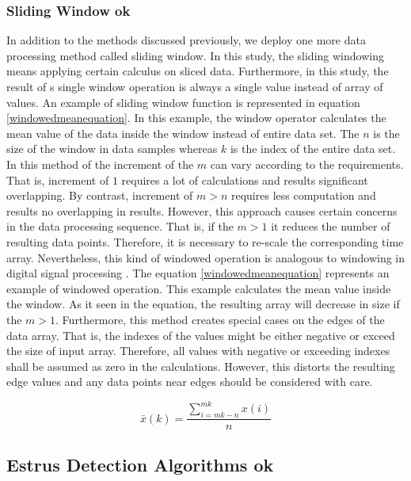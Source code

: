 \documentclass[english,12pt,a4paper,pdftex,elec,utf8]{aaltothesis}
\begin{document}

\subsubsection{Sliding Window ok} \label{slidingwindowsection}

In addition to the methods discussed previously, we deploy one more data processing method called sliding window. In this study, the sliding windowing means applying certain calculus on sliced data. Furthermore, in this study, the result of s single window operation is always a single value instead of array of values. An example of sliding window function is represented in equation \ref{windowedmeanequation}. In this example, the window operator calculates the mean value of the data inside the window instead of entire data set. The $n$ is the size of the window in data samples whereas $k$ is the index of the entire data set. In this method of the increment of the $m$ can vary according to the requirements. That is, increment of $1$ requires a lot of calculations and results significant overlapping. By contrast, increment of $m > n$ requires less computation and results no overlapping in results. However, this approach causes certain concerns in the data processing sequence. That is, if the $m > 1$ it reduces the number of resulting data points. Therefore, it is necessary to re-scale the corresponding time array. Nevertheless, this kind of windowed operation is analogous to windowing in digital signal processing \cite{tan2007digital} \cite{miao2007signal}. The equation \ref{windowedmeanequation} represents an example of windowed operation. This example calculates the mean value inside the window. As it seen in the equation, the resulting array will decrease in size if the $m > 1$. Furthermore, this method creates special cases on the edges of the data array. That is, the indexes of the values might be either negative or exceed the size of input array. Therefore, all values with negative or exceeding indexes shall be assumed as zero in the calculations. However, this distorts the resulting edge values and any data points near edges should be considered with care.

\begin{equation} \label{windowedmeanequation}
\bar{x}(k) = \frac{ \sum\limits^{mk}_{i = mk - n} x(i)}{n}
\end{equation} 


\subsection{Estrus Detection Algorithms ok} \label{estrusdetectionalgorithmssection}
\end{document}

